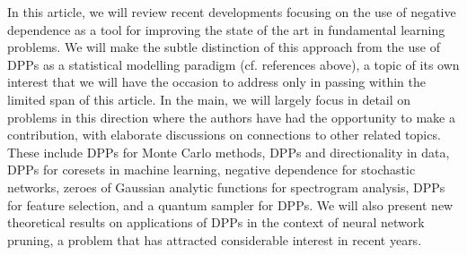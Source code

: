 In this article, we will review recent developments focusing on the use of negative dependence as a tool for improving the state of the art in fundamental learning problems. We will make the subtle distinction of this approach from the use of DPPs as a statistical modelling paradigm (cf. references above), a topic of its own interest that we will have the occasion to address only in passing within the limited span of this article. In the main, we will largely focus in detail on problems in this direction where the authors have had the opportunity to make a contribution, with elaborate discussions on connections to other related topics. These include DPPs for Monte Carlo methods, DPPs and directionality in data, DPPs for coresets in machine learning, negative dependence for stochastic networks, zeroes of Gaussian analytic functions for spectrogram analysis, DPPs for feature selection, and a quantum sampler for DPPs. We will also present new theoretical results on applications of DPPs in the context of neural network pruning, a problem that has attracted considerable interest in recent years. 



